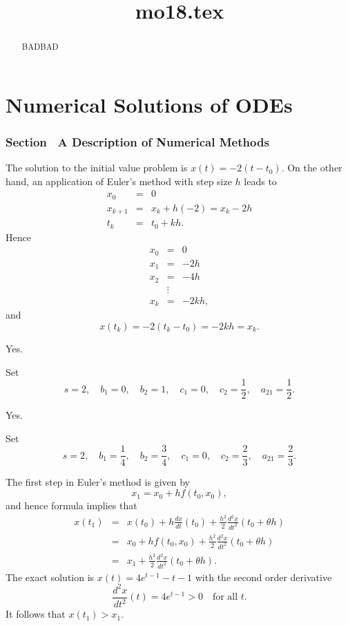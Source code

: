 \documentclass{ximera}
\title{mo18.tex}
\begin{document}
\begin{abstract}
BADBAD
\end{abstract}
\maketitle

\chapter{Numerical Solutions of ODEs}

\subsection*{Section~\protect{\ref{sec:DNM}} A Description of Numerical Methods}

 The solution to the initial value problem is
$x(t)=-2(t-t_0)$.  On the other hand, an application of Euler's method
with step size $h$ leads to
\[
\begin{array}{rcl}
x_0 & = & 0 \\
x_{k+1} & = & x_k + h (-2) = x_k - 2h\\
t_k & = & t_0 + kh.
\end{array}
\]
Hence
\[
\begin{array}{rcl}
x_0 & = & 0\\
x_1 & = & -2h\\
x_2 & = & -4h\\
 & \vdots & \\
x_k & = & -2kh,
\end{array}
\]
and
\[
x(t_k) = -2(t_k-t_0) = -2kh = x_k.
\]

 \ans Yes.

\soln Set
\[
s=2,\quad b_1=0,\quad b_2=1,\quad c_1=0,\quad c_2=\frac{1}{2},\quad
a_{21}=\frac{1}{2}.
\]

 \ans Yes.

\soln Set
\[
s=2,\quad b_1=\frac{1}{4},\quad b_2=\frac{3}{4},\quad
c_1=0,\quad c_2=\frac{2}{3},\quad a_{21}=\frac{2}{3}.
\]

 The first step in Euler's method is given by
\[
x_1 = x_0 + hf(t_0,x_0),
\]
and hence formula  implies that
\begin{eqnarray*}
x(t_1) &=&  x(t_0)+h\frac{dx}{dt}(t_0)+
\frac{h^2}{2}\frac{d^2x}{dt^2}(t_0+\theta h)\\
&=& x_0 + hf(t_0,x_0) +\frac{h^2}{2}\frac{d^2x}{dt^2}(t_0+\theta h)\\
&=& x_1 +\frac{h^2}{2}\frac{d^2x}{dt^2}(t_0+\theta h).
\end{eqnarray*}
The exact solution is $x(t)= 4e^{t-1}-t-1$ with the second order
derivative
\[
\frac{d^2x}{dt^2}(t) = 4e^{t-1}>0\quad \mbox{for all $t$.}
\]
It follows that $x(t_1) > x_1$.
\end{document}
